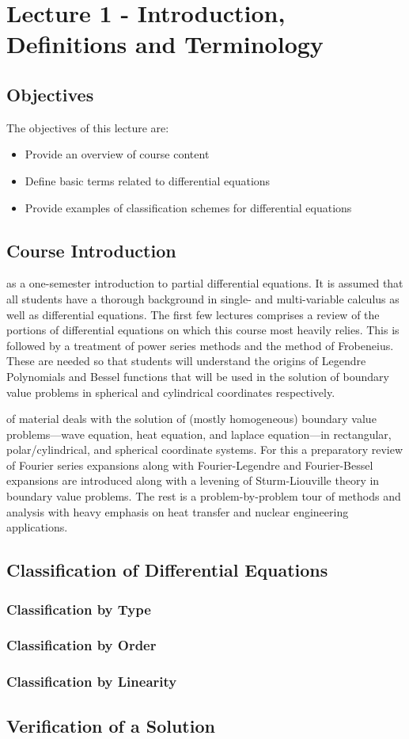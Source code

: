 \chapter{Lecture 1 - Introduction, Definitions and Terminology}
\label{ch:lec1}%
\section{Objectives}
The objectives of this lecture are:
\begin{itemize}
\item Provide an overview of course content
\item Define basic terms related to differential equations
\item Provide examples of classification schemes for differential equations
\end{itemize}

\section{Course Introduction}
 as a one-semester introduction to partial differential equations.  It is assumed that all students have a thorough background in single- and multi-variable calculus as well as differential equations.  The first few lectures comprises a review of the portions of differential equations on which this course most heavily relies.  This is followed by a treatment of power series methods and the method of Frobeneius.  These are needed so that students will understand the origins of Legendre Polynomials and Bessel functions that will be used in the solution of boundary value problems in spherical and cylindrical coordinates respectively.

 of material deals with the solution of (mostly homogeneous) boundary value problems---wave equation, heat equation, and laplace equation---in rectangular, polar/cylindrical, and spherical coordinate systems.  For this a preparatory review of Fourier series expansions along with Fourier-Legendre and Fourier-Bessel expansions are introduced along with a levening of Sturm-Liouville theory in boundary value problems.  The rest is a problem-by-problem tour of methods and analysis with heavy emphasis on heat transfer and nuclear engineering applications.

\section{Classification of Differential Equations}

\subsection{Classification by Type}

\subsection{Classification by Order}

\subsection{Classification by Linearity}

\section{Verification of a Solution} 


